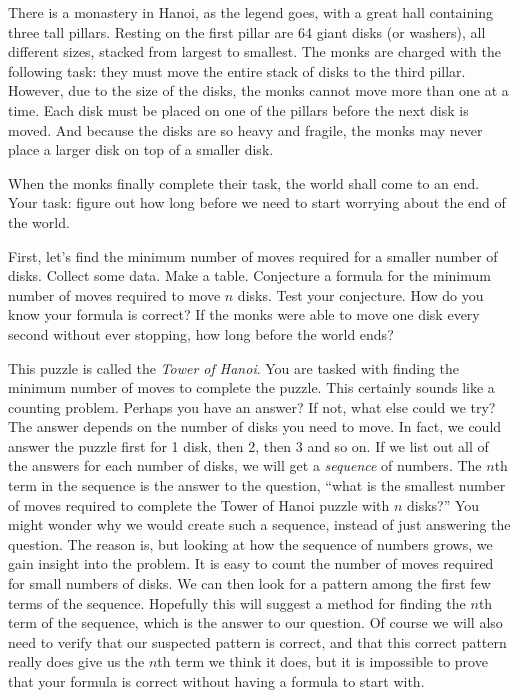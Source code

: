 \documentclass[12pt]{article}
\begin{document}
There is a monastery in Hanoi, as the legend goes, with a great hall containing three tall pillars.  Resting on the first pillar are 64 giant disks (or washers), all different sizes, stacked from largest to smallest.  The monks are charged with the following task: they must move the entire stack of disks to the third pillar.  However, due to the size of the disks, the monks cannot move more than one at a time.  Each disk must be placed on one of the pillars before the next disk is moved.  And because the disks are so heavy and fragile, the monks may never place a larger disk on top of a smaller disk.

When the monks finally complete their task, the world shall come to an end.  Your task: figure out how long before we need to start worrying about the end of the world.

\begin{activity}
\begin{questions}
\question First, let's find the minimum number of moves required for a smaller number of disks.  Collect some data. Make a table.
  \question Conjecture a formula for the minimum number of moves required to move $n$ disks.  Test your conjecture.  How do you know your formula is correct?
  \question If the monks were able to move one disk every second without ever stopping, how long before the world ends?
\end{questions}

\end{activity}


This puzzle is called the {\em Tower of Hanoi}.  You are tasked with finding the minimum number of moves to complete the puzzle.  This certainly sounds like a counting problem.  Perhaps you have an answer?  If not, what else could we try?  The answer depends on the number of disks you need to move.  In fact, we could answer the puzzle first for 1 disk, then 2, then 3 and so on.  If we list out all of the answers for each number of disks, we will get a {\em sequence} of numbers.  The $n$th term in the sequence is the answer to the question, ``what is the smallest number of moves required to complete the Tower of Hanoi puzzle with $n$ disks?''  You might wonder why we would create such a sequence, instead of just answering the question.  The reason is, but looking at how the sequence of numbers grows, we gain insight into the problem.  It is easy to count the number of moves required for small numbers of disks.  We can then look for a pattern among the first few terms of the sequence.  Hopefully this will suggest a method for finding the $n$th term of the sequence, which is the answer to our question.  Of course we will also need to verify that our suspected pattern is correct, and that this correct pattern really does give us the $n$th term we think it does, but it is impossible to prove that your formula is correct without having a formula to start with.  
\end{document}
